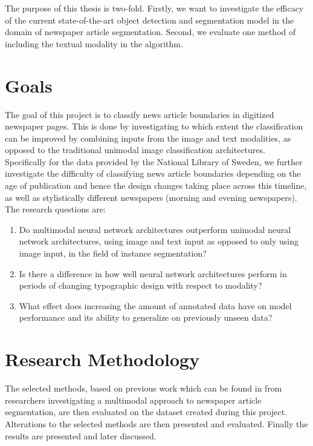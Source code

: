 \documentclass[oneside, english, bibtex]{kththesis}
\begin{document}
The purpose of this thesis is two-fold. Firstly, we want to investigate the efficacy of the current state-of-the-art object detection and segmentation model in the domain of newspaper article segmentation. Second, we evaluate one method of including the textual modality in the algorithm.

\section{Goals}
\label{sec:goals}

The goal of this project is to classify news article boundaries in digitized newspaper pages. This is done by investigating to which extent the classification can be improved by combining inputs from the image and text modalities, as opposed to the traditional unimodal image classification architectures. Specifically for the data provided by the National Library of Sweden, we further investigate the difficulty of classifying news article boundaries depending on the age of publication and hence the design changes taking place across this timeline, as well as stylistically different newspapers (morning and evening newspapers). The research questions are:

\begin{enumerate}
\item Do multimodal neural network architectures outperform unimodal neural network architectures, using image and text input as opposed to only using image input, in the field of instance segmentation?
\item Is there a difference in how well neural network architectures perform in periods of changing typographic design with respect to modality?
\item What effect does increasing the amount of annotated data have on model performance and its ability to generalize on previously unseen data?
\end{enumerate}

\section{Research Methodology}

The selected methods, based on previous work which can be found in  from researchers investigating a multimodal approach to newspaper article segmentation, are then evaluated on the dataset created during this project.
Alterations to the selected methods are then presented and evaluated. Finally the results are presented and later discussed.
\end{document}
